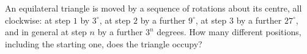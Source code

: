 An equilateral triangle is moved by a sequence of rotations about its centre, all clockwise: at step $1$ by $3^\circ$, at step $2$ by a further $9^\circ$, at step $3$ by a further $27^\circ$, and in general at step $n$ by a further $3^n$ degrees. How many different positions, including the starting one, does the triangle occupy?
